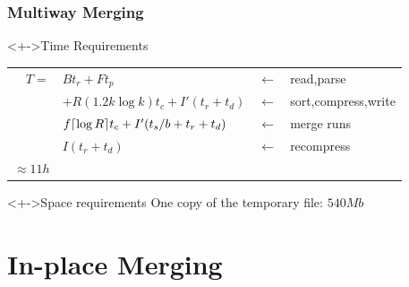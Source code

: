 \documentclass[svgnames]{beamer}
\begin{document}
\begin{frame}
    \frametitle{Multiway Merging}

    \begin{exampleblock}<+->{Time Requirements}
        \small
        \begin{tabular}{rlcl}
            $T =$ & $Bt_r + Ft_p$ & $\leftarrow$ & read,parse \\
            & $+R(1.2k\log k)t_c + I'(t_r + t_d)$ & $\leftarrow$ & sort,compress,write \\
            & $f\lceil \log R \rceil t_c + I'(t_s/b + t_r + t_d)$ & $\leftarrow$ & merge runs \\
            & $I(t_r + t_d)$ & $\leftarrow$ & recompress \\
            \emph{$\approx 11h$}
        \end{tabular}
    \end{exampleblock}


    \begin{exampleblock}<+->{Space requirements}
        One copy of the temporary file: \emph{$540 Mb$}
    \end{exampleblock}

\end{frame}


\section{In-place Merging}
\end{document}
